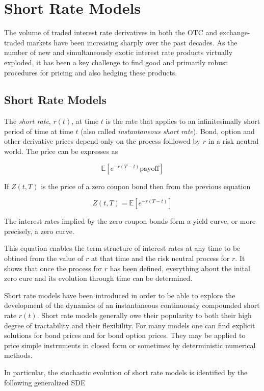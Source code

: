 \chapter{Short Rate Models}

The volume of traded interest rate derivatives in both the OTC and exchange-traded 
markets have been increasing sharply over the past decades. As the number of new 
and simultaneously exotic interest rate products virtually exploded, 
it has been a key challenge to find good and primarily robust procedures for 
pricing and also hedging these products. 

\section{Short Rate Models}
The \emph{short rate}, \(r(t)\), at time \(t\) is the rate that applies to an
infinitesimally short period of time at time \(t\) (also called
\emph{instantaneous short rate}). Bond, option and other derivative prices
depend only on the process folllowed by \(r\) in a risk neutral world.
The price can be expresses as

\[\mathbb{E}[e^{-r(T-t)}\textrm{payoff}]\]

If \(Z(t, T)\) is the price of a zero coupon bond then from the previous
equation

\[Z(t, T) = \mathbb{E}[e^{-r(T-t)}]\]

The interest rates implied by the zero coupon bonds form a yield curve, 
or more precisely, a zero curve.

This equation enables the term structure of interest rates at any time
to be obtined from the value of \(r\) at that time and the risk neutral
process for \(r\). It shows that once the process for \(r\) has been
defined, everything about the inital zero cure and its evolution through
time can be determined.

Short rate models have been introduced in order to be able to explore the development
of the dynamics of an instantaneous continuously compounded short rate $r(t)$.
Short rate models generally owe their popularity to both their high degree of
tractability and their flexibility. For many models one can find explicit solutions
for bond prices and for bond option prices. They may be applied to price simple
instruments in closed form or sometimes by deterministic numerical methods.

In particular, the stochastic evolution of short rate models is identified by
the following generalized SDE

